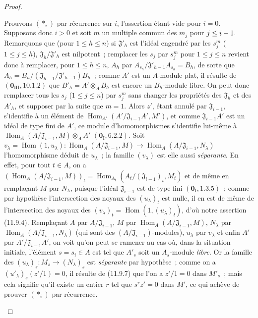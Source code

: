 \begin{proof}
\begin{enumerate}[label=(\roman*)]
  Prouvons $(*_i)$ par récurrence sur $i$, l'assertion étant vide pour $i=0$.
  Supposons donc $i>0$ et soit $m$ un multiple commun des $m_j$ pour
  $j\leq i- 1$. Remarquons que (pour $1\leq h\leq n$) si
  $\mathfrak J'_h$ est l'idéal engendré par les $s_j^m$ ($1\leq j\leq h$),
  $\mathfrak J_h/\mathfrak J'_h$ est nilpotent~; remplacer les $s_j$ par
  $s_j^m$ pour $1\leq j\leq n$ revient donc à remplacer, pour
  $1\leq h\leq n$, $A_h$ par
  $A_{s_h}/\mathfrak J'_{h-1}A_{s_h}=B_h$, de sorte que
  $A_h=B_h/(\mathfrak J_{h-1}/\mathfrak J'_{h-1})B_h$~; comme $A'$ est un
  $A$-module plat, il résulte de $(\mathbf 0_{\mathrm{III}},10.1.2)$ que
  $B'_h=A'\otimes_A B_h$ est encore un $B_h$-module libre. On peut donc
  remplacer tous les $s_j$ ($1\leq j\leq n$) par $s_j^m$ sans changer les
  propriétés des $\mathfrak J_h$ et des $A'_h$, et supposer par la suite que
  $m=1$. Alors $z'$, étant annulé par $\mathfrak J_{i-1}$, s'identifie à un
  élément de
  $\operatorname{Hom}_{A'}(A'/\mathfrak J_{i-1}A',M')$, et comme
  $\mathfrak J_{i-1}A'$ est un idéal de type fini de $A'$, ce module
  d'homomorphismes s'identifie lui-même à
  $\operatorname{Hom}_A(A/\mathfrak J_{i-1},M)\otimes_A A'$
  $(\mathbf 0_{\mathrm I},6.2.2)$. Soit
  $v_\lambda=\operatorname{Hom}(1,u_\lambda):
  \operatorname{Hom}_A(A/\mathfrak J_{i-1},M)\longrightarrow
  \operatorname{Hom}_A(A/\mathfrak J_{i-1},N_\lambda)$
  l'homomorphisme déduit de $u_\lambda$~; la famille $(v_\lambda)$ est elle
  aussi \emph{séparante}. En effet, pour tout $t\in A$, on a
  $(\operatorname{Hom}_A(A/\mathfrak J_{i-1},M))_t
  =\operatorname{Hom}_{A_t}(A_t/(\mathfrak J_{i-1})_t,M_t)$
  et de même en remplaçant $M$ par $N_\lambda$, puisque l'idéal
  $\mathfrak J_{i-1}$ est de type fini $(\mathbf 0_{\mathrm I},1.3.5)$~;
  comme par hypothèse l'intersection des noyaux des $(u_\lambda)_t$ est nulle,
  il en est de même de l'intersection des noyaux des
  $(v_\lambda)_t=\operatorname{Hom}(1,(u_\lambda)_t)$, d'où notre assertion
  (11.9.4). Remplaçant $A$ par $A/\mathfrak J_{i-1}$, $M$ par
  $\operatorname{Hom}_A(A/\mathfrak J_{i-1},M)$, $N_\lambda$ par
  $\operatorname{Hom}_A(A/\mathfrak J_{i-1},N_\lambda)$ (qui sont des
  $(A/\mathfrak J_{i-1})$-modules), $u_\lambda$ par $v_\lambda$ et enfin $A'$
  par $A'/\mathfrak J_{i-1}A'$, on voit qu'on peut se ramener au cas où, dans
  la situation initiale, l'élément $s=s_i\in A$ est tel que $A'_s$ soit un
  $A_s$-module \emph{libre}. Or la famille des
  $(u_\lambda)_s:M_s\to(N_\lambda)_s$ est \emph{séparante} par hypothèse~; comme on a
  $(u'_\lambda)_s(z'/1)=0$, il résulte de (11.9.7) que l'on a $z'/1=0$ dans
  $M'_s$~; mais cela signifie qu'il existe un entier $r$ tel que $s^rz'=0$
  dans $M'$, ce qui achève de prouver $(*_i)$ par récurrence.
\end{enumerate}
\end{proof}

